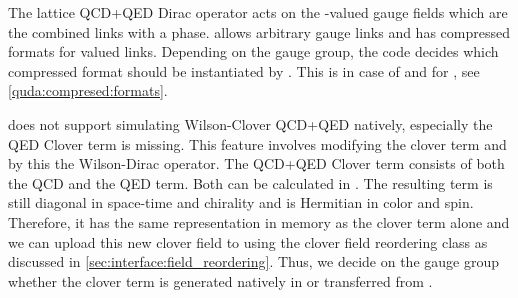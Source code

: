 

The lattice QCD+QED Dirac operator acts on the -valued gauge fields which are the combined  links with a  phase.
\Quda allows arbitrary gauge links and has compressed formats for  valued links.
Depending on the gauge group, the code decides which compressed format should be instantiated by \quda.
This is  in case of  and  for , see \cref{quda:compresed:formats}.

\Quda does not support simulating Wilson-Clover QCD+QED natively, especially the QED Clover term is missing.
This feature involves modifying the clover term and by this the Wilson-Dirac operator.
The QCD+QED Clover term consists of both the QCD  and the QED  term.
Both can be calculated in \openqxd.
The resulting term is still diagonal in space-time and chirality and is Hermitian in color and spin.
Therefore, it has the same representation in memory as the  clover term alone and we can upload this new clover field to \quda using the clover field reordering class as discussed in \cref{sec:interface:field_reordering}.
Thus, we decide on the gauge group whether the clover term is generated natively in \quda or transferred from \openqxd.

